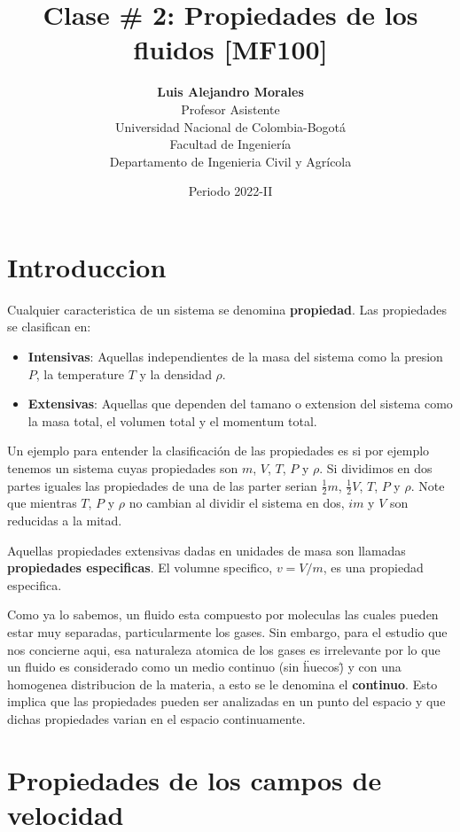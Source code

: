 \documentclass[10pt, oneside]{article}
\title{Clase \# 2: Propiedades de los fluidos [MF100]}
\author{\textbf{Luis Alejandro Morales}\\ \vspace{0.4cm} Profesor Asistente \\ Universidad Nacional de Colombia-Bogot\'a\\Facultad de Ingenier\'ia \\ Departamento de Ingenieria Civil y Agr\'icola}
\date{Periodo 2022-II}
\begin{document}
\maketitle
\tableofcontents

\vspace{.25in}

\section{Introduccion}
Cualquier caracteristica de un sistema se denomina \textbf{propiedad}. Las propiedades se clasifican en:
\begin{itemize}
\item \textbf{Intensivas}: Aquellas independientes de la masa del sistema como la presion $P$, la temperature $T$ y la densidad $\rho$.
\item \textbf{Extensivas}: Aquellas que dependen del tamano o extension del sistema como la masa total, el volumen total y el momentum total.
\end{itemize}
Un ejemplo para entender la clasificaci\'on de las propiedades es si por ejemplo tenemos un sistema cuyas propiedades son $m$, $V$, $T$, $P$ y $\rho$. Si dividimos en dos partes iguales las propiedades de una de las parter serian $\frac{1}{2}m$, $\frac{1}{2}V$, $T$, $P$ y $\rho$. Note que mientras $T$, $P$ y $\rho$ no cambian al dividir el sistema en dos, $im$ y $V$ son reducidas a la mitad.

Aquellas propiedades extensivas dadas en unidades de masa son llamadas \textbf{propiedades especificas}. El volumne specifico, $v=V/m$, es una propiedad especifica.

Como ya lo sabemos, un fluido esta compuesto por moleculas las cuales pueden estar muy separadas, particularmente los gases. Sin embargo, para el estudio que nos concierne aqui, esa naturaleza atomica de los gases es irrelevante por lo que un fluido es considerado como un medio continuo (sin \"huecos\") y con una homogenea distribucion de la materia, a esto se le denomina el \textbf{continuo}. Esto implica que las propiedades pueden ser analizadas en un punto del espacio y que dichas propiedades varian en el espacio continuamente. 

\section{Propiedades de los campos de velocidad}
\end{document}
